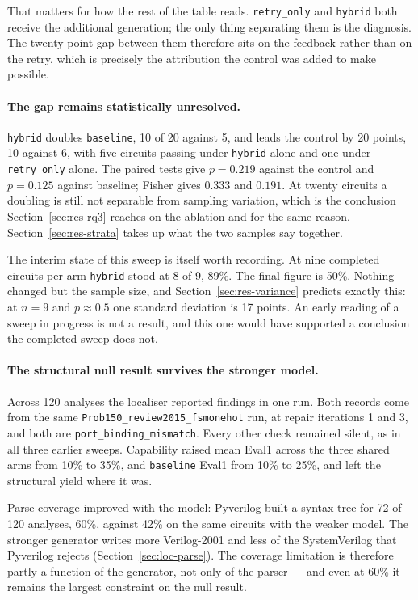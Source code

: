 \documentclass[11pt,a4paper,titlepage=false]{scrreprt}
\begin{document}
That matters for how the rest of the table reads. \texttt{retry\_only} and \texttt{hybrid}
both receive the additional generation; the only thing separating them is the diagnosis. The
twenty-point gap between them therefore sits on the feedback rather than on the retry, which
is precisely the attribution the control was added to make possible.

\paragraph{The gap remains statistically unresolved.} \texttt{hybrid} doubles
\texttt{baseline}, 10 of 20 against 5, and leads the control by 20 points, 10 against 6, with
five circuits passing under \texttt{hybrid} alone and one under \texttt{retry\_only} alone.
The paired tests give $p=0.219$ against the control and $p=0.125$ against baseline; Fisher
gives $0.333$ and $0.191$. At twenty circuits a doubling is still not separable from sampling
variation, which is the conclusion Section~\ref{sec:res-rq3} reaches on the ablation and for
the same reason. Section~\ref{sec:res-strata} takes up what the two samples say together.

The interim state of this sweep is itself worth recording. At nine completed circuits per arm
\texttt{hybrid} stood at 8 of 9, 89\%. The final figure is 50\%. Nothing changed but the
sample size, and Section~\ref{sec:res-variance} predicts exactly this: at $n=9$ and $p\approx
0.5$ one standard deviation is 17 points. An early reading of a sweep in progress is not a
result, and this one would have supported a conclusion the completed sweep does not.

\paragraph{The structural null result survives the stronger model.} Across 120 analyses the
localiser reported findings in one run. Both records come from the same
\texttt{Prob150\_\allowbreak review2015\_\allowbreak fsmonehot} run, at repair iterations 1
and 3, and both are \texttt{port\_binding\_mismatch}. Every other check remained silent, as in
all three earlier sweeps. Capability raised mean Eval1 across the three shared arms from
10\% to 35\%, and \texttt{baseline} Eval1 from 10\% to 25\%, and left the structural yield
where it was.

Parse coverage improved with the model: Pyverilog built a syntax tree for 72 of 120 analyses,
60\%, against 42\% on the same circuits with the weaker model. The stronger generator writes
more Verilog-2001 and less of the SystemVerilog that Pyverilog rejects
(Section~\ref{sec:loc-parse}). The coverage limitation is therefore partly a function of the
generator, not only of the parser --- and even at 60\% it remains the largest constraint on
the null result.
\end{document}
